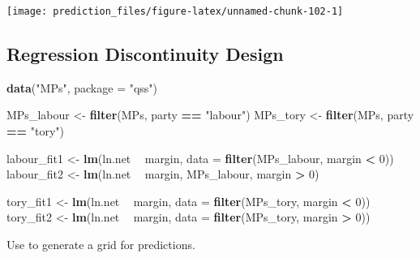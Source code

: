 \documentclass[]{book}
\newenvironment{Shaded}{\begin{snugshade}}{\end{snugshade}}
\newcommand{\DataTypeTok}[1]{\textcolor[rgb]{0.13,0.29,0.53}{#1}}
\newcommand{\DecValTok}[1]{\textcolor[rgb]{0.00,0.00,0.81}{#1}}
\newcommand{\KeywordTok}[1]{\textcolor[rgb]{0.13,0.29,0.53}{\textbf{#1}}}
\newcommand{\NormalTok}[1]{#1}
\newcommand{\OperatorTok}[1]{\textcolor[rgb]{0.81,0.36,0.00}{\textbf{#1}}}
\newcommand{\StringTok}[1]{\textcolor[rgb]{0.31,0.60,0.02}{#1}}
\theoremstyle{definition}
\theoremstyle{definition}
\theoremstyle{definition}
\theoremstyle{remark}
\begin{document}
\begin{center}\texttt{[image: prediction\_files/figure-latex/unnamed-chunk-102-1]} \end{center}

\hypertarget{regression-discontinuity-design}{%
\subsection{Regression Discontinuity
Design}\label{regression-discontinuity-design}}

\begin{Shaded}
\begin{Highlighting}[]
\KeywordTok{data}\NormalTok{(}\StringTok{"MPs"}\NormalTok{, }\DataTypeTok{package =} \StringTok{"qss"}\NormalTok{)}

\NormalTok{MPs_labour <-}\StringTok{ }\KeywordTok{filter}\NormalTok{(MPs, party }\OperatorTok{==}\StringTok{ "labour"}\NormalTok{)}
\NormalTok{MPs_tory <-}\StringTok{ }\KeywordTok{filter}\NormalTok{(MPs, party }\OperatorTok{==}\StringTok{ "tory"}\NormalTok{)}

\NormalTok{labour_fit1 <-}\StringTok{ }\KeywordTok{lm}\NormalTok{(ln.net }\OperatorTok{~}\StringTok{ }\NormalTok{margin,}
                 \DataTypeTok{data =} \KeywordTok{filter}\NormalTok{(MPs_labour, margin }\OperatorTok{<}\StringTok{ }\DecValTok{0}\NormalTok{))}
\NormalTok{labour_fit2 <-}\StringTok{ }\KeywordTok{lm}\NormalTok{(ln.net }\OperatorTok{~}\StringTok{ }\NormalTok{margin, MPs_labour, margin }\OperatorTok{>}\StringTok{ }\DecValTok{0}\NormalTok{)}

\NormalTok{tory_fit1 <-}\StringTok{ }\KeywordTok{lm}\NormalTok{(ln.net }\OperatorTok{~}\StringTok{ }\NormalTok{margin,}
                \DataTypeTok{data =} \KeywordTok{filter}\NormalTok{(MPs_tory, margin }\OperatorTok{<}\StringTok{ }\DecValTok{0}\NormalTok{))}
\NormalTok{tory_fit2 <-}\StringTok{ }\KeywordTok{lm}\NormalTok{(ln.net }\OperatorTok{~}\StringTok{ }\NormalTok{margin, }\DataTypeTok{data =} \KeywordTok{filter}\NormalTok{(MPs_tory, margin }\OperatorTok{>}\StringTok{ }\DecValTok{0}\NormalTok{))}
\end{Highlighting}
\end{Shaded}

Use to generate a grid for predictions.
\end{document}

